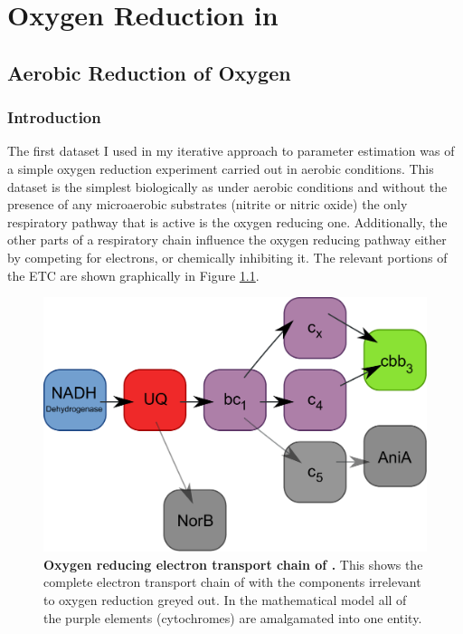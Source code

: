 \chapter{Oxygen Reduction in \Nm{}}
\label{chap:oxygenreduction}
\section{Aerobic Reduction of Oxygen}
\subsection{Introduction}
The first dataset I used in my iterative approach to parameter estimation was of a simple oxygen reduction experiment carried out in aerobic conditions. This dataset is the simplest biologically as under aerobic conditions and without the presence of any microaerobic substrates (nitrite or nitric oxide) the only respiratory pathway that is active is the oxygen reducing one. Additionally, the other parts of a respiratory chain influence the oxygen reducing pathway either by competing for electrons, or chemically inhibiting it. The relevant portions of the ETC are shown graphically in Figure \ref{fig:o2_resp_chain}.

\begin{figure}[tbp]
	\centering
	\includegraphics[width=14cm]{05-oxygenreduction/data/o2_resp_chain.pdf}
	\caption[Oxygen reducing electron transport chain of \Nm{}]{{\bf Oxygen reducing electron transport chain of \Nm{}.} This shows the complete electron transport chain of \Nsm{} with the components irrelevant to oxygen reduction greyed out. In the mathematical model all of the purple elements (cytochromes) are amalgamated into one entity.
	\label{fig:o2_resp_chain}}
\end{figure}


